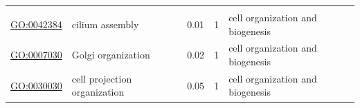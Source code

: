 \documentclass[
]{article}
\begin{document}
\begin{longtable}[]{@{}lllll@{}}
\begin{minipage}[t]{0.17\columnwidth}
\end{minipage}\tabularnewline
\begin{minipage}[t]{0.17\columnwidth}\raggedright
\url{GO:0042384}\strut
\end{minipage} & \begin{minipage}[t]{0.17\columnwidth}\raggedright
cilium assembly\strut
\end{minipage} & \begin{minipage}[t]{0.17\columnwidth}\raggedright
0.01\strut
\end{minipage} & \begin{minipage}[t]{0.17\columnwidth}\raggedright
1\strut
\end{minipage} & \begin{minipage}[t]{0.17\columnwidth}\raggedright
cell organization and biogenesis\strut
\end{minipage}\tabularnewline
\begin{minipage}[t]{0.17\columnwidth}\raggedright
\url{GO:0007030}\strut
\end{minipage} & \begin{minipage}[t]{0.17\columnwidth}\raggedright
Golgi organization\strut
\end{minipage} & \begin{minipage}[t]{0.17\columnwidth}\raggedright
0.02\strut
\end{minipage} & \begin{minipage}[t]{0.17\columnwidth}\raggedright
1\strut
\end{minipage} & \begin{minipage}[t]{0.17\columnwidth}\raggedright
cell organization and biogenesis\strut
\end{minipage}\tabularnewline
\begin{minipage}[t]{0.17\columnwidth}\raggedright
\url{GO:0030030}\strut
\end{minipage} & \begin{minipage}[t]{0.17\columnwidth}\raggedright
cell projection organization\strut
\end{minipage} & \begin{minipage}[t]{0.17\columnwidth}\raggedright
0.05\strut
\end{minipage} & \begin{minipage}[t]{0.17\columnwidth}\raggedright
1\strut
\end{minipage} & \begin{minipage}[t]{0.17\columnwidth}\raggedright
cell organization and biogenesis\strut
\end{minipage}\tabularnewline

\end{longtable}
\end{document}
